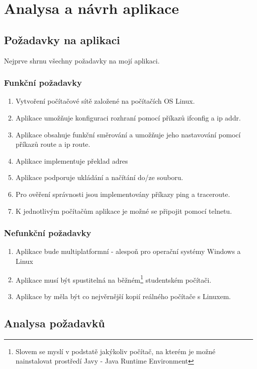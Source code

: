 \chapter{Analysa a návrh aplikace}


\section{Požadavky na aplikaci}

Nejprve shrnu všechny požadavky na mojí aplikaci.

\subsection{Funkční požadavky}
\begin{enumerate}
 \item Vytvoření počítačové sítě založené na počítačích OS Linux.
 \item Aplikace umožňuje konfiguraci rozhraní pomocí příkazů ifconfig a ip addr.
 \item Aplikace obsahuje funkční směrování a umožňuje jeho nastavování pomocí příkazů route a ip route.
 \item Aplikace implementuje překlad adres
 \item Aplikace podporuje ukládání a načítání do/ze souboru.
 \item Pro ověření správnosti jsou implementovány příkazy ping a traceroute.
 \item K jednotlivým počítačům aplikace je možné se připojit pomocí telnetu.
\end{enumerate}

\subsection{Nefunkční požadavky}
\begin{enumerate}
 \item Aplikace bude multiplatformní - alespoň pro operační systémy Windows a Linux
 \item Aplikace musí být spustitelná na běžném\footnote{Slovem  se myslí v podstatě jakýkoliv počítač, na kterém je možné nainstalovat prostředí Javy - Java Runtime Environment} studentském počítači.
 \item Aplikace by měla být co nejvěrnější kopií reálného počítače s Linuxem.
\end{enumerate}


\section{Analysa požadavků}

